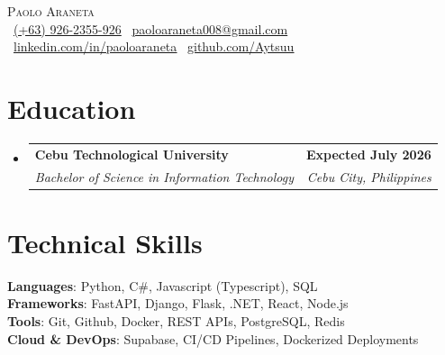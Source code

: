 \documentclass[letterpaper,11pt]{article}
\makeatletter
\newcommand{\resumeSubheading}[4]{
  \vspace{-2pt}\item
    \begin{tabular*}{1.0\textwidth}[t]{l@{\extracolsep{\fill}}r}
      \textbf{#1} & \textbf{\small #2} \\
      \textit{\small#3} & \textit{\small #4} \\
    \end{tabular*}\vspace{-7pt}
}
\newcommand{\resumeSubHeadingListStart}{\begin{itemize}[leftmargin=0.0in, label={}]}
\newcommand{\resumeSubHeadingListEnd}{\end{itemize}}\vspace{0pt}
\makeatother
\begin{document}
\begin{center}
    {\Large \scshape Paolo Araneta} \\[2mm]
    \footnotesize \raisebox{-0.1\height}
  \ \underline{(+63) 926-2355-926} \hspace{0.2em}\textbar\hspace{0.2em}
  {\  \underline{paoloaraneta008@gmail.com}} \hspace{0.2em}\textbar\hspace{0.2em}
  {\ \underline{\href{https://www.linkedin.com/in/paoloaraneta/}{linkedin.com/in/paoloaraneta}}} \hspace{0.2em}\textbar\hspace{0.2em}
  {\ \underline{\href{https://github.com/Aytsuu}{github.com/Aytsuu}}}
    \vspace{-8pt}
    \vspace{12pt}
\end{center}

\section{Education}
  \resumeSubHeadingListStart
    \resumeSubheading
      {Cebu Technological University}{Expected July 2026}
      {Bachelor of Science in Information Technology
      }{Cebu City, Philippines}
  \resumeSubHeadingListEnd
    \vspace{-12pt}
\section{Technical Skills}
 \begin{itemize}[leftmargin=0.15in, label={}]
    \small{\item{   
      \textbf{Languages}{: Python, C\#, Javascript (Typescript), SQL} \\[1mm]
      \textbf{Frameworks}{: FastAPI, Django, Flask, .NET, React, Node.js} \\[1mm]
      \textbf{Tools}{: Git, Github, Docker, REST APIs, PostgreSQL, Redis} \\[1mm]
      \textbf{Cloud \& DevOps}{: Supabase, CI/CD Pipelines, Dockerized Deployments} \\[1mm]
    }}
 \end{itemize}
 \vspace{-16pt}
 \vspace{3pt}

\end{document}
